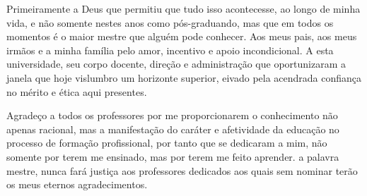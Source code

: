 Primeiramente a Deus que permitiu que tudo isso acontecesse, ao longo de minha vida, e não somente nestes anos como pós-graduando, mas que em todos os momentos é o maior mestre que alguém pode conhecer. Aos meus pais, aos meus irmãos e a minha família pelo amor, incentivo e apoio incondicional. A esta universidade, seu corpo docente, direção e administração que oportunizaram a janela que hoje vislumbro um horizonte superior, eivado pela acendrada confiança no mérito e ética aqui presentes. 

Agradeço a todos os professores por me proporcionarem o conhecimento não apenas racional, mas a manifestação do caráter e afetividade da educação no processo de formação profissional, por tanto que se dedicaram a mim, não somente por terem me ensinado, mas por terem me feito aprender. a palavra mestre, nunca fará justiça aos professores dedicados aos quais sem nominar terão os meus eternos agradecimentos.